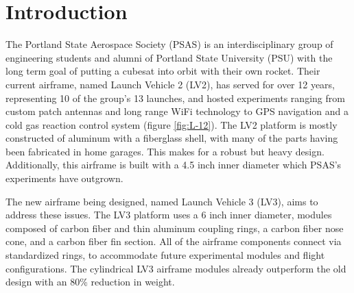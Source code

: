 \documentclass{aiaa-tc}%
\newcommand{\weightReduction}{80\%}
\begin{document}
\section{Introduction}
The Portland State Aerospace Society (PSAS) is an interdisciplinary group of engineering students and alumni of Portland State University (PSU) with the long term goal of putting a cubesat into orbit with their own rocket. 
Their current airframe, named Launch Vehicle 2 (LV2), has served for over 12 years, representing 10 of the group's 13 launches, and hosted experiments ranging from custom patch antennas and long range WiFi technology to GPS navigation and a cold gas reaction control system (figure \ref{fig:L-12}). The LV2 platform is mostly constructed of aluminum with a fiberglass shell, with many of the parts having been fabricated in home garages. This makes for a robust but heavy design. Additionally, this airframe is built with a 4.5 inch inner diameter which PSAS's experiments have outgrown. 

The new airframe being designed, named Launch Vehicle 3 (LV3), aims to address these issues. The LV3 platform uses a 6 inch inner diameter, modules composed of carbon fiber and thin aluminum coupling rings, a carbon fiber nose cone, and a carbon fiber fin section. All of the airframe components connect via standardized rings, to accommodate future experimental modules and flight configurations.
The cylindrical LV3 airframe modules already outperform the old design with an \weightReduction{} reduction in weight.
\end{document}
